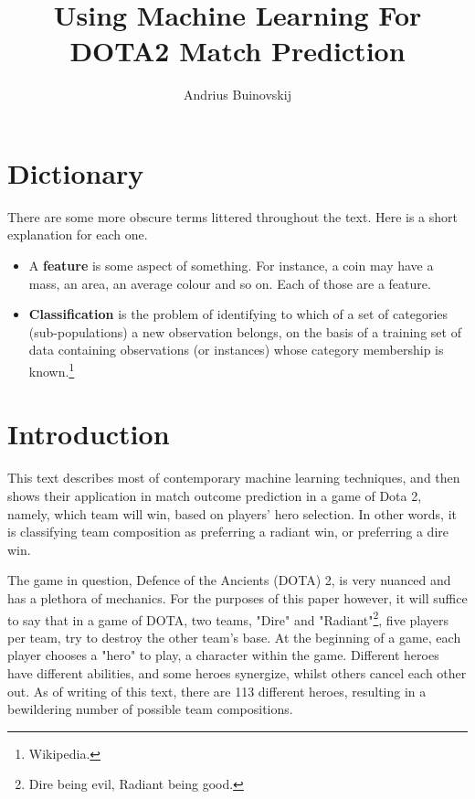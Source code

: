 \documentclass[a4paper, 12pt]{article}
\begin{document}
\title{Using Machine Learning For DOTA2 Match Prediction}
\author{Andrius Buinovskij}
\maketitle

    \section{Dictionary}

	\par There are some more obscure terms littered throughout the text. Here is a short explanation for each one.

        \begin{itemize}
            \item A \textbf{feature} is some aspect of something. For instance, a coin may have a mass, an area, an average colour and so on. Each of those are a feature.
            \item \textbf{Classification} is the problem of identifying to which of a set of categories (sub-populations) a new observation belongs, on the basis of a training set of data containing observations (or instances) whose category membership is known.\footnote{Wikipedia.} \\

        \end{itemize}

    \section{Introduction}

        \par This text describes most of contemporary machine learning techniques, and then shows their application in match outcome prediction in a game of Dota 2, namely, which team will win, based on players' hero selection. In other words, it is classifying team composition as preferring a radiant win, or preferring a dire win.

        \par The game in question, Defence of the Ancients (DOTA) 2, is very nuanced and has a plethora of mechanics. For the purposes of this paper however, it will suffice to say that in a game of DOTA, two teams, "Dire" and "Radiant"\footnote{Dire being evil, Radiant being good.}, five players per team, try to destroy the other team's base. At the beginning of a game, each player chooses a "hero" to play, a character within the game. Different heroes have different abilities, and some heroes synergize, whilst others cancel each other out. As of writing of this text, there are 113 different heroes, resulting in a bewildering number of possible team compositions.
\end{document}
